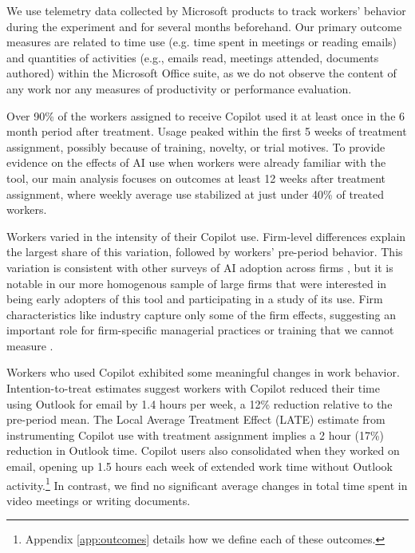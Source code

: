 \documentclass{article}
\begin{document}
We use telemetry data collected by Microsoft products to track workers' behavior during the experiment and for several months beforehand. Our primary outcome measures are related to time use (e.g. time spent in meetings or reading emails) and quantities of activities (e.g., emails read, meetings attended, documents authored) within the Microsoft Office suite, as we do not observe the content of any work nor any measures of productivity or performance evaluation.


Over 90\% of the workers assigned to receive Copilot used it at least once in the 6 month period after treatment. Usage peaked within the first 5 weeks of treatment assignment, possibly because of training, novelty, or trial motives. To provide evidence on the effects of AI use when workers were already familiar with the tool, our main analysis focuses on outcomes at least 12 weeks after treatment assignment, where weekly average use stabilized at just under 40\% of treated workers.  


Workers varied in the intensity of their Copilot use. Firm-level differences explain the largest share of this variation, followed by workers' pre-period behavior. This variation is consistent with other surveys of AI adoption across firms \citep{bonney2024tracking, mcelheran2024ai}, but it is notable in our more homogenous sample of large firms that were interested in being early adopters of this tool and participating in a study of its use. Firm characteristics like industry capture only some of the firm effects, suggesting an important role for firm-specific managerial practices or training that we cannot measure \citep{mcelheran2025rise}. 

Workers who used Copilot exhibited some meaningful changes in work behavior. Intention-to-treat estimates suggest workers with Copilot reduced their time using Outlook for email by 1.4 hours per week, a 12\% reduction relative to the pre-period mean. The Local Average Treatment Effect (LATE) estimate from instrumenting Copilot use with treatment assignment implies a 2 hour (17\%) reduction in Outlook time. Copilot users also consolidated when they worked on email, opening up 1.5 hours each week of extended work time without Outlook activity.\footnote{Appendix \ref{app:outcomes} details how we define each of these outcomes.}  In contrast, we find no significant average changes in total time spent in video meetings or writing documents.
\end{document}
